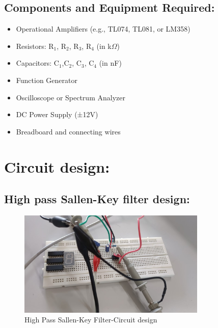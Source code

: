\documentclass{article}
\begin{document}
\subsection{Components and Equipment Required:}
\begin{itemize}
    \item Operational Amplifiers (e.g., TL074, TL081, or LM358)
    \item Resistors: R$_1$, R$_2$, R$_3$, R$_4$ (in k$\Omega$)
    \item Capacitors: C$_1$,C$_2$, C$_3$, C$_4$ (in nF)
    \item Function Generator
    \item Oscilloscope or Spectrum Analyzer
    \item DC Power Supply (±12V)
    \item Breadboard and connecting wires
\end{itemize}

\section{Circuit design:}
\subsection{High pass Sallen-Key filter design:}

\begin{figure}[H]
    \centering
    \includegraphics[width=0.8\textwidth]{figs/highpasscircuit.jpeg}
    \caption{High Pass Sallen-Key Filter-Circuit design}
\end{figure}
\end{document}
